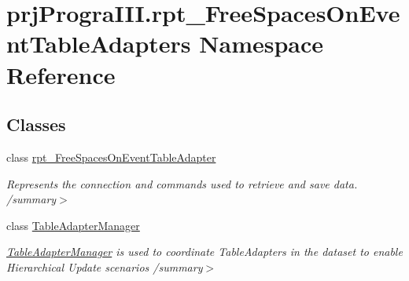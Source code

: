 \hypertarget{namespaceprj_progra_i_i_i_1_1rpt___free_spaces_on_event_table_adapters}{}\section{prj\+Progra\+I\+I\+I.\+rpt\+\_\+\+Free\+Spaces\+On\+Event\+Table\+Adapters Namespace Reference}
\label{namespaceprj_progra_i_i_i_1_1rpt___free_spaces_on_event_table_adapters}
\subsection*{Classes}
\begin{DoxyCompactItemize}
\item 
class \hyperlink{classprj_progra_i_i_i_1_1rpt___free_spaces_on_event_table_adapters_1_1rpt___free_spaces_on_event_table_adapter}{rpt\+\_\+\+Free\+Spaces\+On\+Event\+Table\+Adapter}
\begin{DoxyCompactList}\small\item\em Represents the connection and commands used to retrieve and save data. /summary$>$ \end{DoxyCompactList}\item 
class \hyperlink{classprj_progra_i_i_i_1_1rpt___free_spaces_on_event_table_adapters_1_1_table_adapter_manager}{Table\+Adapter\+Manager}
\begin{DoxyCompactList}\small\item\em \hyperlink{classprj_progra_i_i_i_1_1rpt___free_spaces_on_event_table_adapters_1_1_table_adapter_manager}{Table\+Adapter\+Manager} is used to coordinate Table\+Adapters in the dataset to enable Hierarchical Update scenarios /summary$>$ \end{DoxyCompactList}\end{DoxyCompactItemize}
